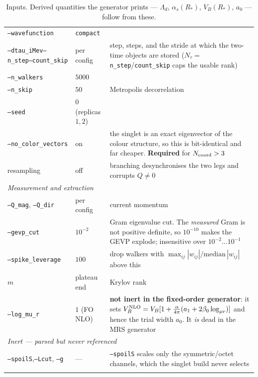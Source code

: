 \documentclass[11pt]{article}
\newcommand{\code}[1]{\texttt{\small #1}}
\begin{document}
{\begin{longtable}{@{}p{3.0cm}p{3.0cm}>{\raggedright\arraybackslash}p{9.6cm}@{}}
\code{--wavefunction} & \code{compact} & \\
\code{--dtau\_iMev}\newline \code{--n\_step}\newline \code{--count\_skip} & per config & step, steps, and
  the stride at which the two-time objects are stored ($N_\tau=$\,\code{n\_step}/\code{count\_skip}
  caps the usable rank) \\
\code{--n\_walkers} & $5000$ & \\
\code{--n\_skip}   & $50$ & Metropolis decorrelation \\
\code{--seed}      & $0$ (replicas $1,2$) & \\
\code{--no\_color\_vectors} & on & the singlet is an exact eigenvector of the colour structure,
  so this is bit-identical and far cheaper.  \textbf{Required} for $N_{\rm coord}>3$ \\
resampling         & off & branching desynchronises the two legs and corrupts $Q\neq0$ \\
\midrule
\multicolumn{3}{l}{\emph{Measurement and extraction}}\\
\code{--Q\_mag}, \code{--Q\_dir} & per config & current momentum \\
\code{--gevp\_cut} & $10^{-2}$ & Gram eigenvalue cut.  The \emph{measured} Gram is not positive
  definite, so $10^{-10}$ makes the GEVP explode; insensitive over $10^{-2}\dots10^{-1}$ \\
\code{--spike\_leverage} & $100$ & drop walkers with
  $\max_{ij}|w_{ij}|/\mathrm{median}\,|w_{ij}|$ above this \\
$m$ & plateau end & Krylov rank \\
\midrule
\code{--log\_mu\_r} & $1$ (FO NLO) & \textbf{not inert in the fixed-order generator}: it sets
  $V_B^{\rm NLO}=V_B[1+\tfrac{\alpha}{4\pi}(a_1+2\beta_0\log_{\mu r})]$ and hence the trial
  width $a_0$.  It \emph{is} dead in the MRS generator \\
\midrule
\multicolumn{3}{l}{\emph{Inert --- parsed but never referenced}}\\
\code{--spoilS},\newline \code{--Lcut}, \code{--g} & --- & \code{--spoilS} scales only the
  symmetric/octet channels, which the singlet build never selects \\
\bottomrule
\caption{Inputs.  Derived quantities the generator prints --- $\Lambda_d$, $\alpha_s(R_*)$,
$V_B(R_*)$, $a_0$ --- follow from these.}
\label{tab:inputs}
\end{longtable}}
\end{document}
